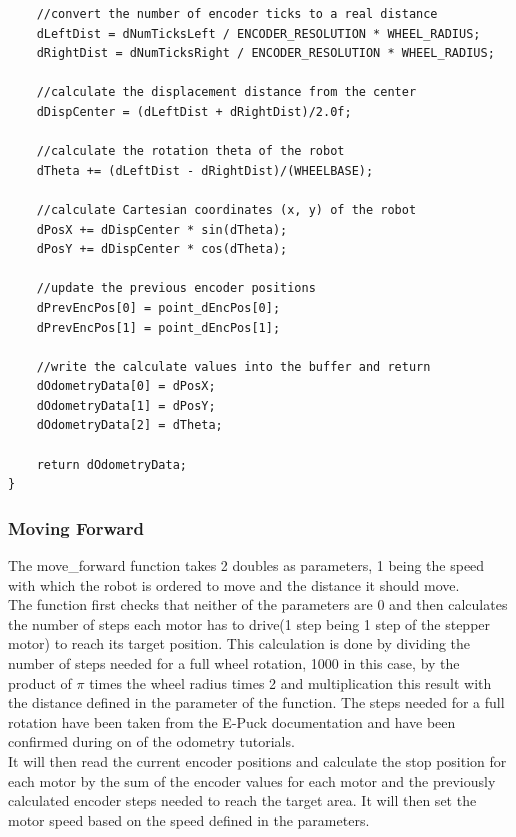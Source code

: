 \documentclass[10pt,a4paper]{article}
\begin{document}
\begin{flushleft}
\begin{lstlisting}
	//convert the number of encoder ticks to a real distance
	dLeftDist = dNumTicksLeft / ENCODER_RESOLUTION * WHEEL_RADIUS;
	dRightDist = dNumTicksRight / ENCODER_RESOLUTION * WHEEL_RADIUS;
	
	//calculate the displacement distance from the center 
	dDispCenter = (dLeftDist + dRightDist)/2.0f;
	
	//calculate the rotation theta of the robot
	dTheta += (dLeftDist - dRightDist)/(WHEELBASE);
	
	//calculate Cartesian coordinates (x, y) of the robot
	dPosX += dDispCenter * sin(dTheta);
	dPosY += dDispCenter * cos(dTheta); 
	
	//update the previous encoder positions
	dPrevEncPos[0] = point_dEncPos[0];
	dPrevEncPos[1] = point_dEncPos[1];
	
	//write the calculate values into the buffer and return
	dOdometryData[0] = dPosX;
	dOdometryData[1] = dPosY;
	dOdometryData[2] = dTheta;
	
	return dOdometryData;
}
\end{lstlisting}

\subsubsection{Moving Forward}
The move\_forward function takes 2 doubles as parameters, 1 being the speed with which the robot is ordered to move and the distance it should move.\\
The function first checks that neither of the parameters are 0 and then calculates the number of steps each motor has to drive(1 step being 1 step of the stepper motor) to reach its target position.
This calculation is done by dividing the number of steps needed for a full wheel rotation, 1000 in this case, by the product of $\pi$ times the wheel radius times 2 and multiplication this result with the distance defined in the parameter of the function. The steps needed for a full rotation have been taken from the E-Puck documentation and have been confirmed during on of the odometry tutorials. \\
It will then read the current encoder positions and calculate the stop position for each motor by the sum of the encoder values for each motor and the previously calculated encoder steps needed to reach the target area. 
It will then set the motor speed based on the speed defined in the parameters.\\[3ex]


\end{flushleft}
\end{document}
